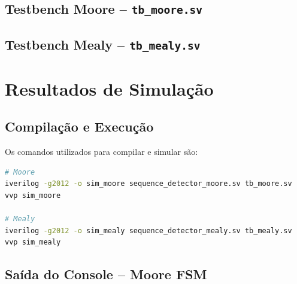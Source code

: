 \documentclass[12pt,a4paper]{article}
\begin{document}
\subsection{Testbench Moore -- \texttt{tb\_moore.sv}}



\subsection{Testbench Mealy -- \texttt{tb\_mealy.sv}}



\section{Resultados de Simulação}

\subsection{Compilação e Execução}

Os comandos utilizados para compilar e simular são:

\begin{lstlisting}[language=bash, caption={Compilação e simulação com Icarus Verilog},
                   label={lst:sim_cmd}]
# Moore
iverilog -g2012 -o sim_moore sequence_detector_moore.sv tb_moore.sv
vvp sim_moore

# Mealy
iverilog -g2012 -o sim_mealy sequence_detector_mealy.sv tb_mealy.sv
vvp sim_mealy
\end{lstlisting}

\subsection{Saída do Console -- Moore FSM}
\end{document}
